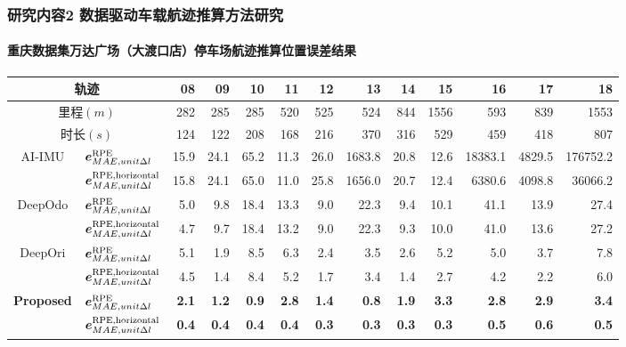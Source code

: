\begin{frame} 
 	\frametitle{研究内容2 数据驱动车载航迹推算方法研究}
 	\framesubtitle{重庆数据集万达广场（大渡口店）停车场航迹推算位置误差结果}
    {\footnotesize
    \setlength{\tabcolsep}{2pt}
		\begin{tabular*}{\linewidth}{@{\extracolsep{\fill}}clrrrrrrrrrrr}
			\toprule
			\multicolumn{2}{c}{轨迹} & 08 & 09 & 10 & 11 & 12 & 13 & 14 & 15 & 16 & 17 & 18 \\
			\midrule
			\multicolumn{2}{c}{里程$\left(\unit{m}\right)$} & 282  & 285  & 285  & 520  & 525  & 524  & 844  & 1556 & 593   & 839  & 1553   \\
			\multicolumn{2}{c}{时长$\left(\unit{s}\right)$} & 124  & 122  & 208  & 168  & 216  & 370  & 316  & 529  & 459   & 418  & 807    \\
			\multirow{2}{*}{AI-IMU} & $\vb*{e}^{\mathrm{RPE}}_{MAE,unit \Delta l}$ & 15.9 & 24.1 & 65.2 & 11.3 & 26.0 & 1683.8 & 20.8 & 12.6 & 18383.1 & 4829.5 & 176752.2 \\
			& $\vb*{e}^{\mathrm{RPE,horizontal}}_{MAE,unit \Delta l}$ & 15.8 & 24.1 & 65.0 & 11.0 & 25.8 & 1656.0 & 20.7 & 12.4 & 6380.6 & 4098.8 & 36066.2 \\
			\multirow{2}{*}{DeepOdo} & $\vb*{e}^{\mathrm{RPE}}_{MAE,unit \Delta l}$ & 5.0 & 9.8 & 18.4 & 13.3 & 9.0 & 22.3 & 9.4 & 10.1 & 41.1 & 13.9 & 27.4 \\
			& $\vb*{e}^{\mathrm{RPE,horizontal}}_{MAE,unit \Delta l}$ & 4.7 & 9.7 & 18.4 & 13.2 & 9.0 & 22.3 & 9.3 & 10.0 & 41.0 & 13.6 & 27.2 \\
			\multirow{2}{*}{DeepOri} & $\vb*{e}^{\mathrm{RPE}}_{MAE,unit \Delta l}$ & 5.1 & 1.9 & 8.5 & 6.3 & 2.4 & 3.5 & 2.6 & 5.2 & 5.0 & 3.7 & 7.8 \\
			& $\vb*{e}^{\mathrm{RPE,horizontal}}_{MAE,unit \Delta l}$ & 4.5 & 1.4 & 8.4 & 5.2 & 1.7 & 3.4 & 1.4 & 2.7 & 4.2 & 2.2 & 6.0 \\
			\multirow{2}{*}{\textbf{Proposed}} & $\vb*{e}^{\mathrm{RPE}}_{MAE,unit \Delta l}$ & \textbf{2.1} & \textbf{1.2} & \textbf{0.9} & \textbf{2.8} & \textbf{1.4} & \textbf{0.8} & \textbf{1.9} & \textbf{3.3} & \textbf{2.8} & \textbf{2.9} & \textbf{3.4} \\
			& $\vb*{e}^{\mathrm{RPE,horizontal}}_{MAE,unit \Delta l}$ & \textbf{0.4} & \textbf{0.4} & \textbf{0.4} & \textbf{0.4} & \textbf{0.3} & \textbf{0.3} & \textbf{0.3} & \textbf{0.3} & \textbf{0.5} & \textbf{0.6} & \textbf{0.5} \\
			\bottomrule 
		\end{tabular*}
	}	
\end{frame}

